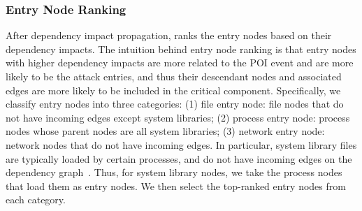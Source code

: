 \subsubsection{Entry Node Ranking}
\label{subsubsec:entry-ranking}
After dependency impact propagation, \tool ranks the entry nodes
based on their dependency impacts.
%
The intuition behind entry node ranking is that entry nodes with higher dependency impacts are more related to the POI event and are more likely to be the attack entries, and thus their 
descendant nodes and associated edges are more likely to be included in the critical component.
%
Specifically, 
we classify entry nodes into three categories: (1) file entry node: file nodes that do not have incoming edges except system libraries; (2) process entry node: process nodes whose parent nodes are all system libraries; (3) network entry node: network nodes that do not have incoming edges. 
In particular, system library files are typically loaded by certain processes, and do not have incoming edges on the dependency graph~\cite{reduction2}.
Thus, for system library nodes, we take the process nodes that load them as entry nodes.
We then select the top-ranked entry nodes from each category.








